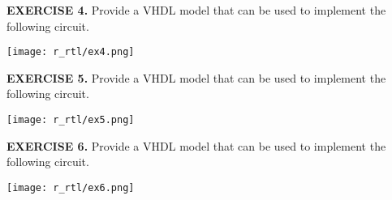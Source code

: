 \vspace{20pt}
\noindent
\begin{minipage}[t]{0.5\textwidth}
\textbf{EXERCISE 4.}
Provide a VHDL model that can be used to implement the following circuit.
\end{minipage}
\begin{minipage}[t]{0.47\textwidth}
\vspace{0pt}\raggedright
\centering
\texttt{[image: r\_rtl/ex4.png]}
\end{minipage}

\vspace{20pt}
\noindent
\begin{minipage}[t]{0.5\textwidth}
\textbf{EXERCISE 5.}
Provide a VHDL model that can be used to implement the following circuit.
\end{minipage}
\begin{minipage}[t]{0.47\textwidth}
\vspace{0pt}\raggedright
\centering
\texttt{[image: r\_rtl/ex5.png]}
\end{minipage}

\vspace{20pt}
\noindent
\begin{minipage}[t]{0.5\textwidth}
\textbf{EXERCISE 6.}
Provide a VHDL model that can be used to implement the following circuit.
\end{minipage}
\begin{minipage}[t]{0.47\textwidth}
\vspace{0pt}\raggedright
\centering
\texttt{[image: r\_rtl/ex6.png]}
\end{minipage}
